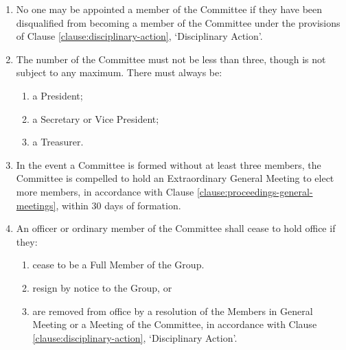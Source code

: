 \documentclass[12pt]{constitution}
\begin{document}
\begin{enumerate}
\begin{enumerate}
    \end{enumerate}
    \item No one may be appointed a member of the Committee if they have been disqualified from becoming a member of the Committee under the provisions of Clause \ref{clause:disciplinary-action}, `Disciplinary Action'.
    \item The number of the Committee must not be less than three, though is not subject to any maximum. There must always be:
    \begin{enumerate}
        \item a President;
        \item a Secretary or Vice President;
        \item a Treasurer.
    \end{enumerate}
    \item In the event a Committee is formed without at least three members, the Committee is compelled to hold an Extraordinary General Meeting to elect more members, in accordance with Clause \ref{clause:proceedings-general-meetings}, within 30 days of formation.

    \item An officer or ordinary member of the Committee shall cease to hold office if they:
    \begin{enumerate}
        \item cease to be a Full Member of the Group.
        \item resign by notice to the Group, or
        \item are removed from office by a resolution of the Members in General Meeting or a Meeting of the Committee, in accordance with Clause \ref{clause:disciplinary-action}, `Disciplinary Action'.
    \end{enumerate}
\end{enumerate}


\label{clause:meetings-committee}
\end{document}
